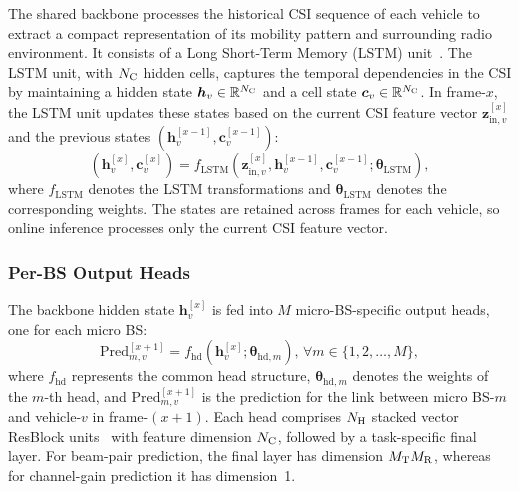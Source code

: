 \documentclass[10pt,journal,letterpaper]{journal_template/IEEEtran}
\newcommand{\rev}[1]{\textcolor{revisioncolor}{{}#1}}
\theoremstyle{remark}
\newtheorem*{remark}{Remark}
\begin{document}
The shared backbone processes the historical CSI sequence of each vehicle to extract a compact representation of its mobility pattern and surrounding radio environment. It consists of a Long Short-Term Memory (LSTM) unit~\cite{lstm}. 
The LSTM unit, with $N_{\rm C}$ hidden cells, captures the temporal dependencies in the CSI by maintaining a hidden state $\bm{h}_v \in \mathbb{R}^{N_{\rm C}}$ and a cell state $\bm{c}_v \in \mathbb{R}^{N_{\rm C}}$. In frame-$x$, the LSTM unit updates these states based on the current CSI feature vector $\bm{z}_{\text{in},v}^{[x]}$ and the previous states $(\bm{h}_v^{[x-1]}, \bm{c}_v^{[x-1]})$:
\begin{equation}
\label{eq:lstm_update}
    \left(\bm{h}_v^{[x]}, \bm{c}_v^{[x]}\right) = f_{\text{LSTM}} \left(\bm{z}_{\text{in},v}^{[x]}, \bm{h}_v^{[x-1]}, \bm{c}_v^{[x-1]} ;\bm{\theta}_{\text{LSTM}} \right),
\end{equation}
where $f_{\text{LSTM}}$ denotes the LSTM transformations and $\bm{\theta}_{\text{LSTM}}$ denotes the corresponding weights. 
\rev{The states are retained across frames for each vehicle, so online inference processes only the current CSI feature vector.}

\subsubsection{Per-BS Output Heads}
The backbone hidden state $\bm{h}_v^{[x]}$ is fed into $M$ micro-BS-specific output heads, one for each micro BS:
\begin{equation}
\label{eq:OutputHead}
    \text{Pred}_{m,v}^{[x+1]} = f_{\text{hd}} \left(\bm{h}_v^{[x]};\bm{\theta}_{\text{hd},m} \right), \, \forall m \in \{1,2,\dots,M\},
\end{equation}
where $f_{\text{hd}}$ represents the common head structure, 
$\bm{\theta}_{\text{hd},m}$ denotes the weights of the $m$-th head, and $\text{Pred}_{m,v}^{[x+1]}$ is the prediction for the link between micro BS-$m$ and vehicle-$v$ in frame-$(x\!+\!1)$.
Each head comprises $N_{\rm H}$ stacked vector ResBlock units~\cite{He2016} with feature dimension $N_{\rm C}$, followed by a task-specific final layer. For beam-pair prediction, the final layer has dimension $M_{\rm T}M_{\rm R}$, whereas for channel-gain prediction it has dimension~1.
\end{document}
